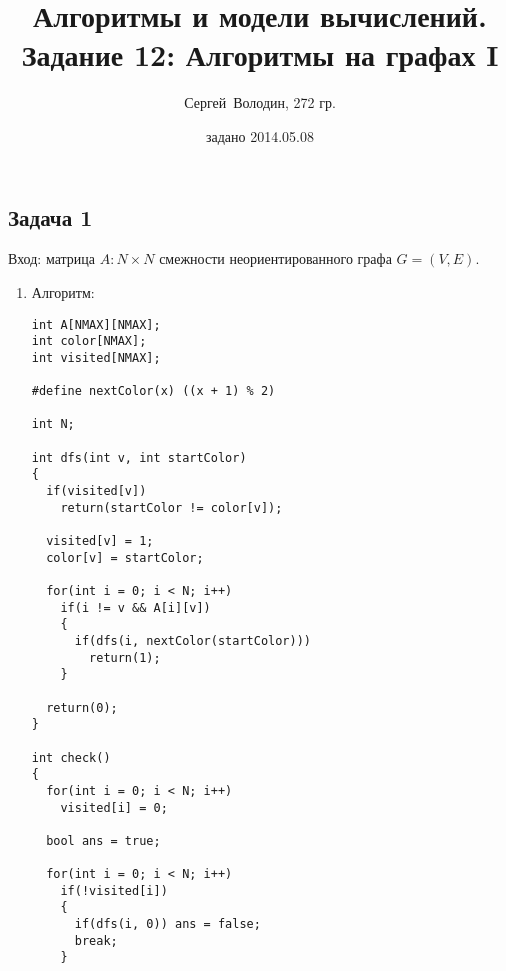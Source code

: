 \documentclass[a4paper]{article}
\date{задано 2014.05.08}
\author{Сергей~Володин, 272 гр.}
\title{Алгоритмы и модели вычислений.\\Задание 12: Алгоритмы на графах I}
\begin{document}
\maketitle
\subsection*{Задача 1}
Вход: матрица $A\colon N\times N$ смежности неориентированного графа $G=(V,E)$.
\begin{enumerate}
\item Алгоритм:
\begin{lstlisting}
int A[NMAX][NMAX];
int color[NMAX];
int visited[NMAX];

#define nextColor(x) ((x + 1) % 2)

int N;

int dfs(int v, int startColor)
{
  if(visited[v])
    return(startColor != color[v]);

  visited[v] = 1;
  color[v] = startColor;

  for(int i = 0; i < N; i++)
    if(i != v && A[i][v])
    {
      if(dfs(i, nextColor(startColor)))
        return(1);
    }

  return(0);
}

int check()
{
  for(int i = 0; i < N; i++)
    visited[i] = 0;

  bool ans = true;

  for(int i = 0; i < N; i++)
    if(!visited[i])
    {
      if(dfs(i, 0)) ans = false;
      break;
    }


\end{lstlisting}
\end{enumerate}
\end{document}
